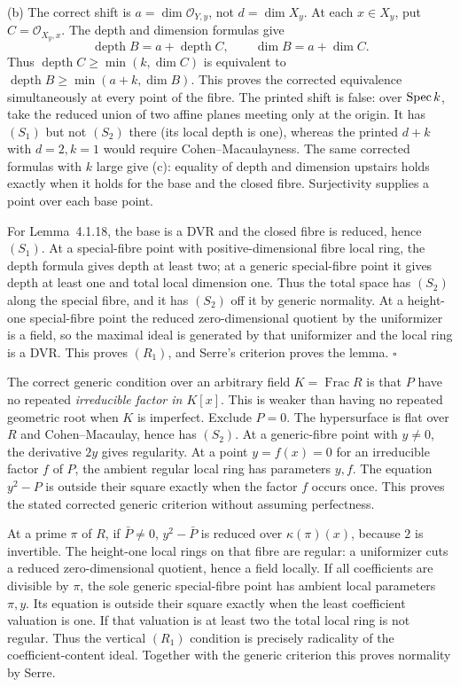 \documentclass[11pt]{article}
\let\chapterexercise\exercise
\renewcommand{\exercise}[2]{\Needspace{8\baselineskip}\chapterexercise{#1}{#2}}
\begin{document}
(b) The correct shift is $a=\dim\mathcal O_{Y,y}$, not $d=\dim X_y$. At each $x\in X_y$, put $C=\mathcal O_{X_y,x}$. The depth and dimension formulas give
\[ \operatorname{depth}B=a+\operatorname{depth}C,\qquad \dim B=a+\dim C. \]
Thus $\operatorname{depth}C\ge\min(k,\dim C)$ is equivalent to $\operatorname{depth}B\ge\min(a+k,\dim B)$. This proves the corrected equivalence simultaneously at every point of the fibre. The printed shift is false: over $\operatorname{Spec} k$, take the reduced union of two affine planes meeting only at the origin. It has $(S_1)$ but not $(S_2)$ there (its local depth is one), whereas the printed $d+k$ with $d=2,k=1$ would require Cohen--Macaulayness. The same corrected formulas with $k$ large give (c): equality of depth and dimension upstairs holds exactly when it holds for the base and the closed fibre. Surjectivity supplies a point over each base point.

For Lemma~4.1.18, the base is a DVR and the closed fibre is reduced, hence $(S_1)$. At a special-fibre point with positive-dimensional fibre local ring, the depth formula gives depth at least two; at a generic special-fibre point it gives depth at least one and total local dimension one. Thus the total space has $(S_2)$ along the special fibre, and it has $(S_2)$ off it by generic normality. At a height-one special-fibre point the reduced zero-dimensional quotient by the uniformizer is a field, so the maximal ideal is generated by that uniformizer and the local ring is a DVR. This proves $(R_1)$, and Serre's criterion proves the lemma. \hfill$\square$

\pf
The correct generic condition over an arbitrary field $K=\operatorname{Frac}R$ is that $P$ have no repeated \emph{irreducible factor in $K[x]$}. This is weaker than having no repeated geometric root when $K$ is imperfect. Exclude $P=0$. The hypersurface is flat over $R$ and Cohen--Macaulay, hence has $(S_2)$. At a generic-fibre point with $y\ne0$, the derivative $2y$ gives regularity. At a point $y=f(x)=0$ for an irreducible factor $f$ of $P$, the ambient regular local ring has parameters $y,f$. The equation $y^2-P$ is outside their square exactly when the factor $f$ occurs once. This proves the stated corrected generic criterion without assuming perfectness.

At a prime $\pi$ of $R$, if $\bar P\ne0$, $y^2-\bar P$ is reduced over $\kappa(\pi)(x)$, because $2$ is invertible. The height-one local rings on that fibre are regular: a uniformizer cuts a reduced zero-dimensional quotient, hence a field locally. If all coefficients are divisible by $\pi$, the sole generic special-fibre point has ambient local parameters $\pi,y$. Its equation is outside their square exactly when the least coefficient valuation is one. If that valuation is at least two the total local ring is not regular. Thus the vertical $(R_1)$ condition is precisely radicality of the coefficient-content ideal. Together with the generic criterion this proves normality by Serre.
\end{document}
